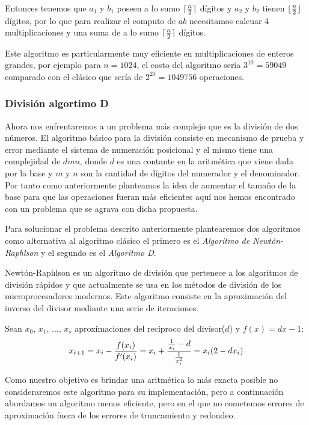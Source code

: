\documentclass[a4paper,10pt,twocolumn]{article}
\begin{document}
	 Entonces tenemos que $a_1$ y $b_1$ poseen a lo sumo $\lceil {n\over 2}\rceil$ dígitos y $a_2$ y $b_2$ tienen $\lfloor {n\over 2}\rfloor$ dígitos, por lo que para realizar el computo de $ab$ necesitamos calcuar 4 multiplicaciones y una suma de a lo sumo $\lceil {n\over 2}\rceil$ dígitos.
	 
	 Este algoritmo es particularmente muy eficiente en multiplicaciones de enteros grandes, por ejemplo para $n=1024$, el costo del algoritmo sería $3^{10}=59049$ comparado con el clásico que sería de $2^{20}=1049756$ operaciones. 
	
	
\subsubsection{División algortimo D}\label{sub:division}
	Ahora nos enfrentaremos a un problema más complejo que es la división de dos números. El algoritmo básico para la división consiste en mecanismo de prueba y error mediante el sistema de numeración posicional y el mismo tiene una complejidad de $d m n$, donde $d$ es una contante en la aritmética que viene dada por la base y $m$ y $n$ son la cantidad de dígitos del numerador y el denominador. Por tanto como anteriormente planteamos la idea de aumentar el tamaño de la base para que las operaciones fueran más eficientes aquí nos hemos encontrado con un problema que se agrava con dicha propuesta.
	
	Para solucionar el problema descrito anteriormente plantearemos dos algoritmos como alternativa al algoritmo clásico el primero es el \emph{Algoritmo de Newtón-Raphlson} y el segundo es el \emph{Algoritmo D}.
	
	Newtón-Raphlson es un algoritmo de división que pertenece a los algoritmos de división rápidos y que actualmente se usa en los métodos de división de los microprocesadores modernos. Este algoritmo consiste en la aproximación del inverso del divisor mediante una serie de iteraciones.
	
	Sean $x_0$, $x_1$, $\ldots$, $x_s$ aproximaciones del recíproco del divisor($d$) y $f(x)=dx-1$:
	\begin{equation}
		x_{i+1}=x_i-{f(x_i)\over f'(x_i)}=x_i+{{1\over x_i}-d\over{1\over x^2_i}} =x_i(2-dx_i)
	\end{equation}
	
	Como nuestro objetivo es brindar una aritmética lo más exacta posible no consideraremos este algoritmo para su implementación, pero a continuación abordamos un algoritmo menos eficiente, pero en el que no cometemos errores de aproximación fuera de los errores de truncamiento y redondeo.
	
\end{document}
